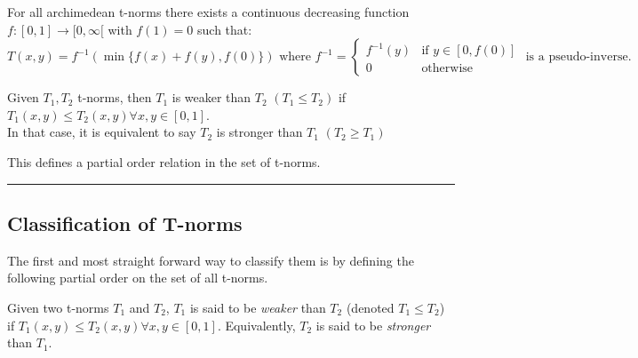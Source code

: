\begin{proposition}
  For all archimedean t-norms there exists a continuous decreasing function $f:[0,1] \longrightarrow [0,\infty[$ with $f(1)=0$ such that: 
  \[ 
  T(x,y)= f^{-1}(\min\{f(x)+f(y), f(0)\}) \text{ where } f^{-1} =
  \begin{cases}
    f^{-1}(y) & \text{if } y\in [0,f(0) ]\\
    0 & \text{otherwise}
  \end{cases}
  \text{ is a pseudo-inverse}.
  \]
\end{proposition}



\begin{definition}
  Given $T_1, T_2$ t-norms, then $T_1$ is weaker than $T_2$ $(T_1 \leq T_2)$ if $T_1(x,y)\leq T_2(x,y)\forall x,y\in [0,1]$.\\
  In that case, it is equivalent to say $T_2$ is stronger than $T_1$ $(T_2 \geq T_1)$

\end{definition}
\begin{remark}
  This defines a partial order relation in the set of t-norms.
\end{remark}




\noindent\rule{\textwidth}{2pt}


\subsection{Classification of T-norms}
The first and most straight forward way to classify them is by defining the following partial order on the set of all t-norms. 
\begin{definition}
  Given two t-norms $T_1$ and $T_2$, $T_1$ is said to be \emph{weaker} than $T_2$ (denoted $T_1 \leq T_2$) if $T_1(x,y) \leq T_2(x,y) \forall x,y \in [0,1]$.
  Equivalently, $T_2$ is said to be \emph{stronger} than $T_1$.
\end{definition}


